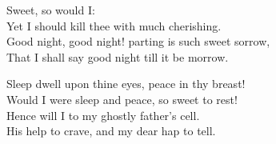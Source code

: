\begin{speech}
Sweet, so would I: \\
Yet I should kill thee with much cherishing. \\
Good night, good night! parting is such sweet sorrow, \\
That I shall say good night till it be morrow. 
\\
\end{speech}
\begin{speech}
Sleep dwell upon thine eyes, peace in thy breast!
\\
Would I were sleep and peace, so sweet to rest! \\
Hence will I to my ghostly father's cell. \\
His help to crave, and my dear hap to tell.  \\

\end{speech}



